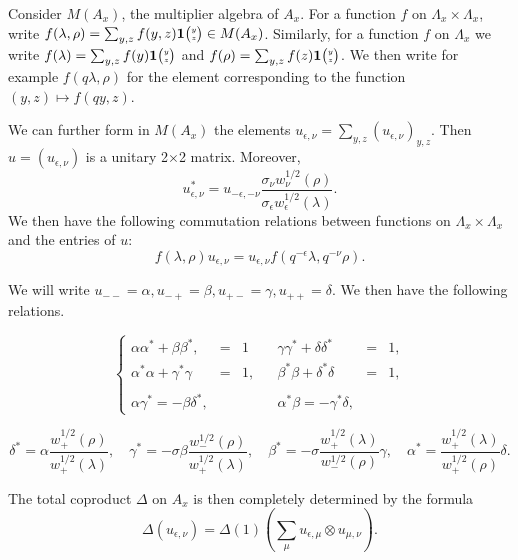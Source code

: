 Consider $M(A_x)$, the multiplier algebra of $A_x$. For a function $f$ on $\Lambda_x\times \Lambda_x$, write $f(\lambda,\rho) = \sum_{y,z} f(y,z)\mathbf{1}{\tiny {\begin{pmatrix} y\\z\end{pmatrix}}} \in M(A_x)$. Similarly, for a function $f$ on $\Lambda_x$ we write $f(\lambda) = \sum_{y,z} f(y)\mathbf{1}{\tiny {\begin{pmatrix} y\\z\end{pmatrix}}}$ and $f(\rho) = \sum_{y,z}f(z)\mathbf{1}{\tiny {\begin{pmatrix} y\\z\end{pmatrix}}}$. We then write for example $f(q\lambda,\rho)$ for the element corresponding to the function $(y,z)\mapsto f(qy,z)$.

We can further form in $M(A_x)$ the elements $u_{\epsilon,\nu} = \sum_{y,z} (u_{\epsilon,\nu})_{y,z}$. Then $u=(u_{\epsilon,\nu})$ is a unitary 2$\times$2 matrix. Moreover, \begin{equation}\label{EqAdju}u_{\epsilon,\nu}^* = u_{-\epsilon,-\nu}\frac{ \sigma_{\nu}w_{\nu}^{1/2}(\rho)}{\sigma_{\epsilon}w_{\epsilon}^{1/2}(\lambda)}.\end{equation} We then have the following commutation relations between functions on $\Lambda_x\times \Lambda_x$ and the entries of $u$: \begin{equation}\label{EqGradu} f(\lambda,\rho)u_{\epsilon,\nu} = u_{\epsilon,\nu}f(q^{-\epsilon}\lambda,q^{-\nu}\rho).\end{equation}

We will write $u_{--}=\alpha, u_{-+}= \beta, u_{+-}=\gamma,u_{++}=\delta$. We then have the following relations.

\begin{equation}\label{EqId1}\left\{\begin{array}{lllllll} \alpha\alpha^* + \beta\beta^*, &=& 1 &&  \gamma\gamma^* + \delta\delta^* &=& 1,\\ \alpha^*\alpha+ \gamma^*\gamma &=&1,&&\beta^*\beta+ \delta^*\delta &=& 1,\\ \\ \alpha \gamma^* = -\beta \delta^*, &&&& \alpha^*\beta = -\gamma^*\delta, \end{array}\right.\end{equation}

\begin{equation}\label{EqId2} \delta^* = \alpha \frac{w_+^{1/2}(\rho)}{w_+^{1/2}(\lambda)}, \quad \gamma^*=  -\sigma \beta\frac{w_{-}^{1/2}(\rho)}{w_+^{1/2}(\lambda)},\quad  \beta^* = -\sigma \frac{w_+^{1/2}(\lambda)}{w_{-}^{1/2}(\rho)}\gamma, \quad  \alpha^* =  \frac{w_+^{1/2}(\lambda)}{w_+^{1/2}(\rho)}\delta.\end{equation}

The total coproduct $\Delta$ on $A_x$ is then completely determined by the formula \[\Delta(u_{\epsilon,\nu}) = \Delta(1)\left(\sum_{\mu} u_{\epsilon,\mu}\otimes u_{\mu,\nu}\right).\]

